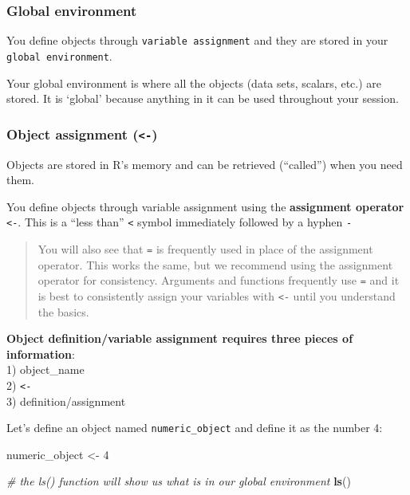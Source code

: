 \documentclass[]{article}
\newenvironment{Shaded}{\begin{snugshade}}{\end{snugshade}}
\newcommand{\KeywordTok}[1]{\textcolor[rgb]{0.13,0.29,0.53}{\textbf{#1}}}
\newcommand{\DecValTok}[1]{\textcolor[rgb]{0.00,0.00,0.81}{#1}}
\newcommand{\StringTok}[1]{\textcolor[rgb]{0.31,0.60,0.02}{#1}}
\newcommand{\CommentTok}[1]{\textcolor[rgb]{0.56,0.35,0.01}{\textit{#1}}}
\newcommand{\NormalTok}[1]{#1}
\begin{document}
\subsubsection{Global environment}\label{global-environment}

You define objects through \texttt{variable\ assignment} and they are
stored in your \texttt{global\ environment}.

Your global environment is where all the objects (data sets, scalars,
etc.) are stored. It is `global' because anything in it can be used
throughout your session.

\subsubsection{\texorpdfstring{Object assignment
(\texttt{\textless{}-})}{Object assignment (\textless{}-)}}\label{object-assignment--}

Objects are stored in R's memory and can be retrieved (``called'') when
you need them.

You define objects through variable assignment using the
\textbf{assignment operator} \texttt{\textless{}-}. This is a ``less
than'' \texttt{\textless{}} symbol immediately followed by a hyphen
\texttt{-}

\begin{quote}
You will also see that \texttt{=} is frequently used in place of the
assignment operator. This works the same, but we recommend using the
assignment operator for consistency. Arguments and functions frequently
use \texttt{=} and it is best to consistently assign your variables with
\texttt{\textless{}-} until you understand the basics.
\end{quote}

\textbf{Object definition/variable assignment requires three pieces of
information}:\\
1) object\_name\\
2) \texttt{\textless{}-}\\
3) definition/assignment

Let's define an object named \texttt{numeric\_object} and define it as
the number 4:

\begin{Shaded}
\begin{Highlighting}[]
\NormalTok{numeric_object <-}\StringTok{ }\DecValTok{4}

\CommentTok{# the ls() function will show us what is in our global environment}
\KeywordTok{ls}\NormalTok{()}
\end{Highlighting}
\end{Shaded}
\end{document}
